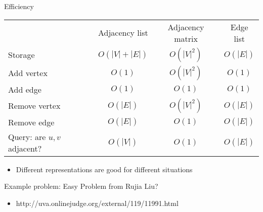 \documentclass[12pt,t]{beamer}
\newcommand{\bi}{\begin{itemize}}
\newcommand{\ei}{\end{itemize}}
\begin{document}
\begin{frame}{Efficiency}

    \vspace{20pt}

    {
        \scriptsize
    \begin{center}
        \begin{tabular}{lccc}
            & Adjacency list & Adjacency matrix & Edge list \\
            Storage & $O(|V| + |E|)$ & $O(|V|^2)$ & $O(|E|)$ \\
            Add vertex & $O(1)$ & $O(|V|^2)$ & $O(1)$ \\
            Add edge & $O(1)$ & $O(1)$ & $O(1)$ \\
            Remove vertex & $O(|E|)$ & $O(|V|^2)$ & $O(|E|)$ \\
            Remove edge & $O(|E|)$ & $O(1)$ & $O(|E|)$ \\
            Query: are $u,v$ adjacent? & $O(|V|)$ & $O(1)$ & $O(|E|)$ \\
        \end{tabular}
    \end{center}
    }

    \bi
        \item Different representations are good for different situations
    \ei
\end{frame}

\begin{frame}{Example problem: Easy Problem from Rujia Liu?}
    \bi
        \item http://uva.onlinejudge.org/external/119/11991.html
    \ei
\end{frame}
\end{document}
